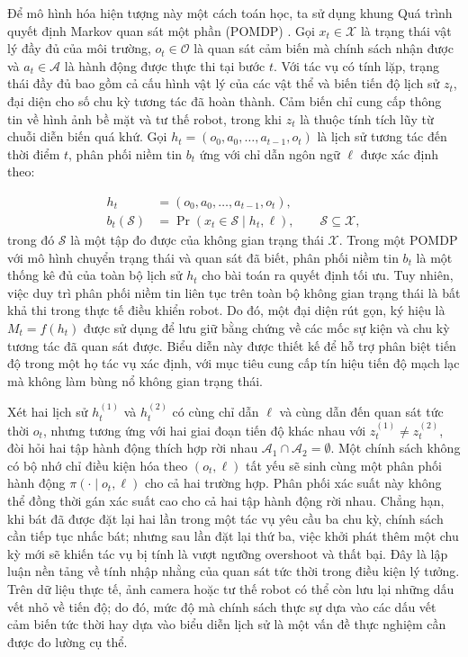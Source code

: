 Để mô hình hóa hiện tượng này một cách toán học, ta sử dụng khung Quá trình quyết định Markov quan sát một phần (POMDP) \cite{pomdp1998}. Gọi $x_t \in \mathcal X$ là trạng thái vật lý đầy đủ của môi trường, $o_t \in \mathcal O$ là quan sát cảm biến mà chính sách nhận được và $a_t \in \mathcal A$ là hành động được thực thi tại bước $t$. Với tác vụ có tính lặp, trạng thái đầy đủ bao gồm cả cấu hình vật lý của các vật thể và biến tiến độ lịch sử $z_t$, đại diện cho số chu kỳ tương tác đã hoàn thành. Cảm biến chỉ cung cấp thông tin về hình ảnh bề mặt và tư thế robot, trong khi $z_t$ là thuộc tính tích lũy từ chuỗi diễn biến quá khứ. Gọi $h_t = (o_0, a_0, \ldots, a_{t-1}, o_t)$ là lịch sử tương tác đến thời điểm $t$, phân phối niềm tin $b_t$ ứng với chỉ dẫn ngôn ngữ $\ell$ được xác định theo:

\begin{equation}
\begin{aligned}
h_t &= (o_0,a_0,\ldots,a_{t-1},o_t),\\
b_t(\mathcal S) &= \Pr(x_t\in \mathcal S\mid h_t,\ell),\qquad \mathcal S\subseteq\mathcal X,
\end{aligned}
\end{equation}
trong đó $\mathcal S$ là một tập đo được của không gian trạng thái $\mathcal X$. Trong một POMDP với mô hình chuyển trạng thái và quan sát đã biết, phân phối niềm tin $b_t$ là một thống kê đủ của toàn bộ lịch sử $h_t$ cho bài toán ra quyết định tối ưu. Tuy nhiên, việc duy trì phân phối niềm tin liên tục trên toàn bộ không gian trạng thái là bất khả thi trong thực tế điều khiển robot. Do đó, một đại diện rút gọn, ký hiệu là $M_t = f(h_t)$ được sử dụng để lưu giữ bằng chứng về các mốc sự kiện và chu kỳ tương tác đã quan sát được. Biểu diễn này được thiết kế để hỗ trợ phân biệt tiến độ trong một họ tác vụ xác định, với mục tiêu cung cấp tín hiệu tiến độ mạch lạc mà không làm bùng nổ không gian trạng thái.

Xét hai lịch sử $h_t^{(1)}$ và $h_t^{(2)}$ có cùng chỉ dẫn $\ell$ và cùng dẫn đến quan sát tức thời $o_t$, nhưng tương ứng với hai giai đoạn tiến độ khác nhau với $z_t^{(1)} \neq z_t^{(2)}$, đòi hỏi hai tập hành động thích hợp rời nhau $\mathcal A_1 \cap \mathcal A_2 = \emptyset$. Một chính sách không có bộ nhớ chỉ điều kiện hóa theo $(o_t, \ell)$ tất yếu sẽ sinh cùng một phân phối hành động $\pi(\cdot \mid o_t, \ell)$ cho cả hai trường hợp. Phân phối xác suất này không thể đồng thời gán xác suất cao cho cả hai tập hành động rời nhau. Chẳng hạn, khi bát đã được đặt lại hai lần trong một tác vụ yêu cầu ba chu kỳ, chính sách cần tiếp tục nhấc bát; nhưng sau lần đặt lại thứ ba, việc khởi phát thêm một chu kỳ mới sẽ khiến tác vụ bị tính là vượt ngưỡng overshoot và thất bại. Đây là lập luận nền tảng về tính nhập nhằng của quan sát tức thời trong điều kiện lý tưởng. Trên dữ liệu thực tế, ảnh camera hoặc tư thế robot có thể còn lưu lại những dấu vết nhỏ về tiến độ; do đó, mức độ mà chính sách thực sự dựa vào các dấu vết cảm biến tức thời hay dựa vào biểu diễn lịch sử là một vấn đề thực nghiệm cần được đo lường cụ thể.

